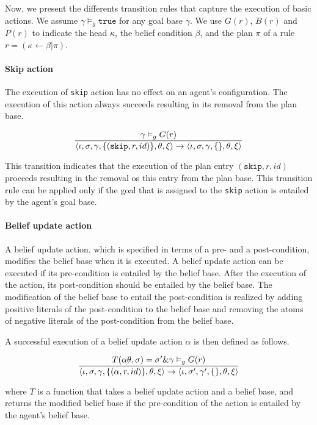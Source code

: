 \documentclass[a4paper]{article}
\begin{document}
Now, we present the differents transition rules that capture the execution of basic actions. We assume $\gamma \vDash_{g} \texttt{true}$ for any goal base $\gamma$. We use $G(r)$, $B(r)$ and $P(r)$ to indicate the head $\kappa$, the belief condition $\beta$, and the plan $\pi$ of a rule $ r = (\kappa \leftarrow \beta \vert \pi)$.

\paragraph{Skip action}

The execution of \texttt{skip} action has no effect on an agent's configuration. The execution of
this action always succeeds resulting in its removal from the plan base.

$$ {{\gamma \vDash_{g} G(r)}\over{\langle \iota, \sigma, \gamma, \{(\texttt{skip}, r, id)\}, \theta, \xi \rangle  \rightarrow \langle \iota, \sigma, \gamma, \{\}, \theta, \xi \rangle}}$$

This transition indicates that the execution of the plan entry $(\texttt{skip}, r, id)$ proceeds resulting in the removal os this entry from the plan base. This transition rule can be applied only if the goal that is assigned to the \texttt{skip} action is entailed by the agent's goal base.

\paragraph{Belief update action}

A belief update action, which is specified in terms of a pre- and a post-condition, modifies the belief base when it is executed. A belief update action can be executed if its pre-condition is entailed by the belief base. After the execution of the action, its post-condition should be entailed by the belief base. The modification of the belief base to entail the post-condition is realized by adding positive literals of the post-condition to the belief base and removing the atoms of negative literals of the post-condition from the belief base.

A successful execution of a belief update action $\alpha$ is then defined as follows.

$$ {{T(\alpha \theta, \sigma) = \sigma' \& \gamma \vDash_{g} G(r)} \over {\langle \iota, \sigma, \gamma, \{(\alpha, r, id)\}, \theta, \xi \rangle  \rightarrow \langle \iota, \sigma', \gamma', \{\}, \theta, \xi \rangle}} $$

where $T$ is a function that takes a belief update action and a belief base, and returns the modified belief base if the pre-condition of the action is entailed by the agent's belief base.
\end{document}
